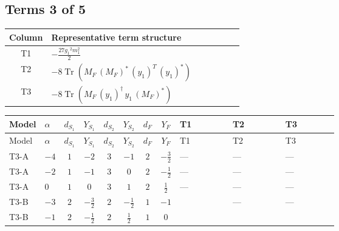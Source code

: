 \documentclass[8pt]{article}
\begin{document}
\begin{landscape}
\subsection*{Terms 3 of 5}
\begin{center}
\begin{tabular}{@{}c >{\raggedright\arraybackslash}p{0.82\linewidth}@{}}
\toprule
Column & Representative term structure \\
\midrule
T1 & \(\displaystyle -\frac{27 {g_1}^2 {m_1^2}}{2}\) \\
\midrule
T2 & \(\displaystyle -8 \operatorname{Tr}\!\left({M_F}\,\left({M_F}\right)^{*}\,\left({y_1}\right)^{T}\,\left({y_1}\right)^{*}\right)\) \\
\midrule
T3 & \(\displaystyle -8 \operatorname{Tr}\!\left({M_F}\,\left({y_1}\right)^{\dagger}\,{y_1}\,\left({M_F}\right)^{*}\right)\) \\
\midrule
\bottomrule
\end{tabular}
\end{center}
\smallskip
\tiny
\begin{longtable}{@{}llcccccc >{\raggedright\arraybackslash}p{0.21\linewidth} >{\raggedright\arraybackslash}p{0.21\linewidth} >{\raggedright\arraybackslash}p{0.21\linewidth}@{}}
\toprule
Model & $\alpha$ & $d_{S_1}$ & $Y_{S_1}$ & $d_{S_2}$ & $Y_{S_2}$ & $d_F$ & $Y_F$ & T1 & T2 & T3 \\
\midrule
\endfirsthead
\toprule
Model & $\alpha$ & $d_{S_1}$ & $Y_{S_1}$ & $d_{S_2}$ & $Y_{S_2}$ & $d_F$ & $Y_F$ & T1 & T2 & T3 \\
\midrule
\endhead
T3-A & $-4$ & $1$ & $-2$ & $3$ & $-1$ & $2$ & $-\frac{3}{2}$ & --- & --- & --- \\
\midrule
T3-A & $-2$ & $1$ & $-1$ & $3$ & $0$ & $2$ & $-\frac{1}{2}$ & --- & --- & --- \\
\midrule
T3-A & $0$ & $1$ & $0$ & $3$ & $1$ & $2$ & $\frac{1}{2}$ & --- & --- & --- \\
\midrule
T3-B & $-3$ & $2$ & $-\frac{3}{2}$ & $2$ & $-\frac{1}{2}$ & $1$ & $-1$ & \scriptsize\adjustbox{max width=\linewidth}{$\begin{gathered} -\frac{27 {g_1}^2 {m_1^2}}{2}\end{gathered}$} & --- & --- \\
\midrule
T3-B & $-1$ & $2$ & $-\frac{1}{2}$ & $2$ & $\frac{1}{2}$ & $1$ & $0$ & \scriptsize\adjustbox{max width=\linewidth}{$\begin{gathered} -\frac{3 {g_1}^2 {m_1^2}}{2}\end{gathered}$} & \scriptsize\adjustbox{max width=\linewidth}{$\begin{gathered} -8 \operatorname{Tr}\!\left({M_F}\,\left({M_F}\right)^{*}\,\left({y_1}\right)^{T}\,\left({y_1}\right)^{*}\right)\end{gathered}$} & \scriptsize\adjustbox{max width=\linewidth}{$\begin{gathered} -8 \operatorname{Tr}\!\left({M_F}\,\left({y_1}\right)^{\dagger}\,{y_1}\,\left({M_F}\right)^{*}\right)\end{gathered}$} \\

\end{longtable}
\end{landscape}
\end{document}
